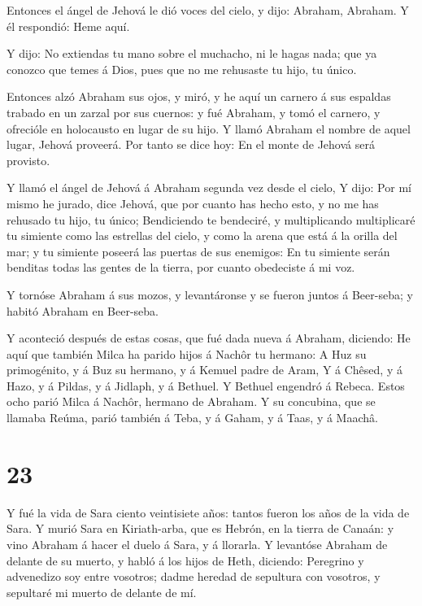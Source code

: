  Entonces el ángel de Jehová le dió voces del cielo, y
dijo: Abraham, Abraham. Y él respondió: Heme aquí.

 Y dijo: No extiendas tu mano sobre el muchacho, ni le
hagas nada; que ya conozco que temes á Dios, pues que no me rehusaste tu
hijo, tu único.

 Entonces alzó Abraham sus ojos, y miró, y he aquí un
carnero á sus espaldas trabado en un zarzal por sus cuernos: y fué
Abraham, y tomó el carnero, y ofrecióle en holocausto en lugar de su
hijo.  Y llamó Abraham el nombre de aquel lugar, Jehová
proveerá. Por tanto se dice hoy: En el monte de Jehová será provisto.

 Y llamó el ángel de Jehová á Abraham segunda vez desde el
cielo,  Y dijo: Por mí mismo he jurado, dice Jehová, que
por cuanto has hecho esto, y no me has rehusado tu hijo, tu único;
 Bendiciendo te bendeciré, y multiplicando multiplicaré tu
simiente como las estrellas del cielo, y como la arena que está á la
orilla del mar; y tu simiente poseerá las puertas de sus enemigos:
 En tu simiente serán benditas todas las gentes de la
tierra, por cuanto obedeciste á mi voz.

 Y tornóse Abraham á sus mozos, y levantáronse y se fueron
juntos á Beer-seba; y habitó Abraham en Beer-seba.

 Y aconteció después de estas cosas, que fué dada nueva á
Abraham, diciendo: He aquí que también Milca ha parido hijos á Nachôr tu
hermano:  A Huz su primogénito, y á Buz su hermano, y á
Kemuel padre de Aram,  Y á Chêsed, y á Hazo, y á Pildas, y
á Jidlaph, y á Bethuel.  Y Bethuel engendró á Rebeca. Estos
ocho parió Milca á Nachôr, hermano de Abraham.  Y su
concubina, que se llamaba Reúma, parió también á Teba, y á Gaham, y á
Taas, y á Maachâ.

\hypertarget{section-22}{%
\section{23}\label{section-22}}

 Y fué la vida de Sara ciento veintisiete años: tantos
fueron los años de la vida de Sara.  Y murió Sara en
Kiriath-arba, que es Hebrón, en la tierra de Canaán: y vino Abraham á
hacer el duelo á Sara, y á llorarla.  Y levantóse Abraham de
delante de su muerto, y habló á los hijos de Heth, diciendo:
 Peregrino y advenedizo soy entre vosotros; dadme heredad de
sepultura con vosotros, y sepultaré mi muerto de delante de mí.

